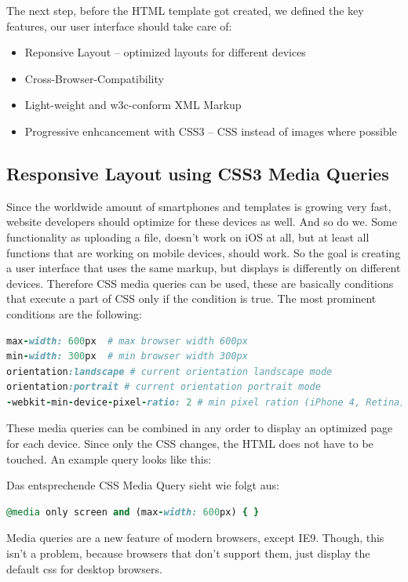 The next step, before the HTML template got created, we defined the key features, our user interface should take care of:
\begin{itemize}
\item Reponsive Layout – optimized layouts for different devices
\item Cross-Browser-Compatibility
\item Light-weight and w3c-conform XML Markup
\item Progressive enhcancement with CSS3 – CSS instead of images where possible
\end{itemize}

\subsection{Responsive Layout using CSS3 Media Queries}
Since the worldwide amount of smartphones and templates is growing very fast, website developers should optimize for these devices as well. And so do we. Some functionality as uploading a file, doesn't work on iOS at all, but at least all functions that are working on mobile devices, should work. So the goal is creating a user interface that uses the same markup, but displays is differently on different devices. Therefore CSS media queries can be used, these are basically conditions that execute a part of CSS only if the condition is true. The most prominent conditions are the following:

\begingroup 
\begin{lstlisting}[caption=CSS Media Queries, label=list:cssMediaQueries, language=Ruby]
max-width: 600px  # max browser width 600px
min-width: 300px  # min browser width 300px
orientation:landscape # current orientation landscape mode
orientation:portrait # current orientation portrait mode
-webkit-min-device-pixel-ratio: 2 # min pixel ration (iPhone 4, Retina)
\end{lstlisting}
\endgroup

These media queries can be combined in any order to display an optimized page for each device. Since only the CSS changes, the HTML does not have to be touched. An example query looks like this: 

Das entsprechende CSS Media Query sieht wie folgt aus:
\begin{lstlisting}[caption=CSS Media Query, label=list:cssMediaQuery, language=Ruby]
@media only screen and (max-width: 600px) { }
\end{lstlisting}

Media queries are a new feature of modern browsers, except IE9. Though, this isn't a problem, because browsers that don't support them, just display the default css for desktop browsers.

